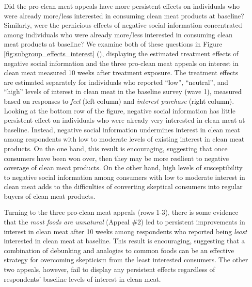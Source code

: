 \documentclass[12pt]{article}
\begin{document}
Did the pro-clean meat appeals have more persistent effects on individuals who were already more/less interested in consuming clean meat products at baseline? Similarly, were the pernicious effects of negative social information concentrated among individuals who were already more/less interested in consuming clean meat products at baseline? We examine both of these questions in Figure \ref{fig:subgroup_effects_interest} (), displaying the estimated treatment effects of negative social information and the three pro-clean meat appeals on interest in clean meat measured 10 weeks after treatment exposure. The treatment effects are estimated separately for individuals who reported ``low'', ``neutral'', and ``high'' levels of interest in clean meat in the baseline survey (wave 1), measured based on responses to \textit{feel} (left column) and \textit{interest purchase} (right column). Looking at the bottom row of the figure, negative social information has little persistent effect on individuals who were already very interested in clean meat at baseline. Instead, negative social information undermines interest in clean meat among respondents with low to moderate levels of existing interest in clean meat products. On the one hand, this result is encouraging, suggesting that once consumers have been won over, then they may be more resilient to negative coverage of clean meat products. On the other hand, high levels of susceptibility to negative social information among consumers with low to moderate interest in clean meat adds to the difficulties of converting skeptical consumers into regular buyers of clean meat products.

Turning to the three pro-clean meat appeals (rows 1-3), there is some evidence that the \textit{most foods are unnatural} (Appeal \#2) led to persistent improvements in interest in clean meat after 10 weeks among respondents who reported being \textit{least} interested in clean meat at baseline. This result is encouraging, suggesting that a combination of debunking and analogies to common foods can be an effective strategy for overcoming skepticism from the least interested consumers. The other two appeals, however, fail to display any persistent effects regardless of respondents' baseline levels of interest in clean meat.

\end{document}
